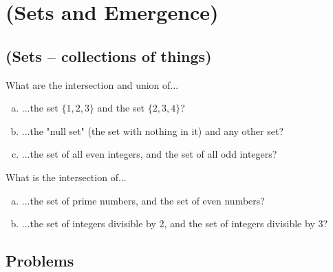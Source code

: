 


\chapter{(Sets and Emergence)}



\section{(Sets -- collections of things)}

\begin{exercise}
What are the intersection and union of...
\begin{enumerate}[(a)]
\item ...the set $\{1, 2, 3\}$ and the set $\{2, 3, 4\}$?
\item ...the "null set" (the set with nothing in it) and any other set?
\item ...the set of all even integers, and the set of all odd integers?
\end{enumerate}
\end{exercise}

\begin{exercise}
What is the intersection of...
\begin{enumerate}[(a)]
\item ...the set of prime numbers, and the set of even numbers?
\item ...the set of integers divisible by 2, and the set of integers divisible by 3?
\end{enumerate}
\end{exercise}


\section{Problems}


